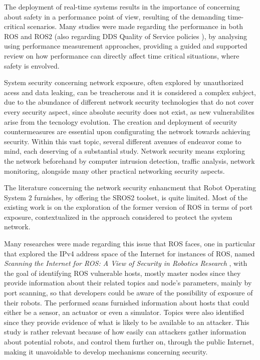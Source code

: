 The deployment of real-time systems results in the importance of concerning about safety in a performance point of view, resulting of the demanding time-critical scenarios. Many studies were made regarding the performance in both ROS and ROS2 (also regarding DDS Quality of Service policies \cite{maruyama2016exploring}), by analysing using performance measurement approaches, providing a guided and supported review on how performance can directly affect time critical situations, where safety is envolved. \cite{maruyama2016exploring, casini2019response} 

System security concerning network exposure, often explored by unauthorized acess and data leaking, can be treacherous and it is considered a complex subject, due to the abundance of different network security technologies that do not cover every security aspect, since absolute security does not exist, as new vulnerabilites arise from the tecnology evolution.\cite{kaeo2004designing} The creation and deployment of security countermeasures are essential upon configurating the network towards achieving security. Within this vast topic, several different avenues of endeavor come to mind, each deserving of a substantial study. Network security means exploring the network beforehand by computer intrusion detection, traffic analysis, network monitoring, alongside many other practical networking security aspects. \cite{marin2005network}

The literature concerning the network security enhancment that Robot Operating System 2 furnishes, by offering the SROS2 toolset, is quite limited. Most of the existing work is on the exploration of the former version of ROS in terms of port exposure, contextualized in the approach considered to protect the system network.  

Many researches were made regarding this issue that ROS faces, one in particular that explored the IPv4 address space of the Internet for instances of ROS, named \textit{Scanning the Internet for ROS: A View of Security in Robotics Research} \cite{8794451}, with the goal of identifying ROS vulnerable hosts, mostly master nodes since they provide information about their related topics and node's parameters, mainly by port scanning, so that developers could be aware of the possibility of exposure of their robots. The performed scans furnished information about hosts that could either be a sensor, an actuator or even a simulator. Topics were also identified since they provide evidence of what is likely to be available to an attacker. This study is rather relevant because of how easily can attackers gather information about potential robots, and control them further on, through the public Internet, making it unavoidable to develop mechanisms concerning security.

